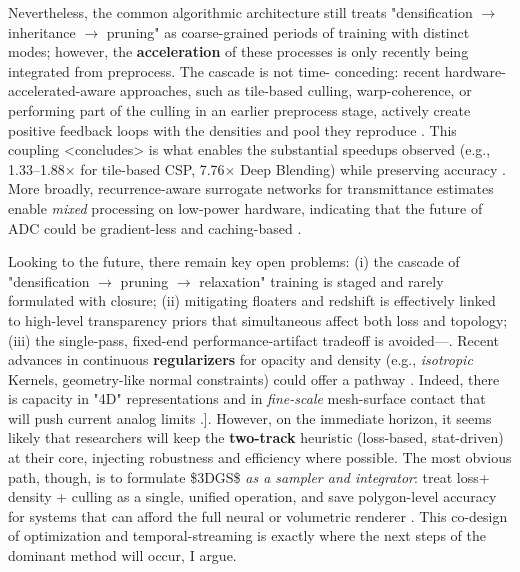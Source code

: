 \documentclass[11pt,a4paper]{article}
\begin{document}
Nevertheless, the common algorithmic architecture still treats "densification $\rightarrow$ inheritance $\rightarrow$ pruning" as coarse-grained periods of training with distinct modes; however, the \textbf{acceleration} of these processes is only recently being integrated from preprocess. The cascade is not time- conceding: recent hardware-accelerated-aware approaches, such as tile-based culling, warp-coherence, or performing part of the culling in an earlier preprocess stage, actively create positive feedback loops with the densities and pool they reproduce \cite{arxiv:2607.28049v1,arxiv:1702.03253v1,arxiv:2602.04251v1}. This coupling <concludes> is what enables the substantial speedups observed (e.g., 1.33--1.88$\times$ for tile-based CSP, 7.76$\times$ Deep Blending) while preserving accuracy \cite{arxiv:2312.10933v1,arxiv:2412.03378v3,arxiv:2602.04251v1}. More broadly, recurrence-aware surrogate networks for transmittance estimates enable \emph{mixed} processing on low-power hardware, indicating that the future of ADC could be gradient-less and caching-based \cite{arxiv:2506.02751v3,arxiv:2506.07069v2}.

Looking to the future, there remain key open problems: (i) the cascade of "densification $\rightarrow$ pruning $\rightarrow$ relaxation" training is staged and rarely formulated with closure; (ii) mitigating floaters and redshift is effectively linked to high-level transparency priors that simultaneous affect both loss and topology; (iii) the single-pass, fixed-end performance-artifact tradeoff is avoided---\cite{arxiv:2605.08565v2}. Recent advances in continuous \textbf{regularizers} for opacity and density (e.g., \emph{isotropic} Kernels, geometry-like normal constraints) could offer a pathway \cite{arxiv:2412.01931v1,arxiv:2605.15010v2}. Indeed, there is capacity in "4D" representations and in \emph{fine-scale} mesh-surface contact that will push current analog limits \cite{arxiv:2605.15010v2,arxiv:2307.02330v2}.]. However, on the immediate horizon, it seems likely that researchers will keep the \textbf{two-track} heuristic (loss-based, stat-driven) at their core, injecting robustness and efficiency where possible. The most obvious path, though, is to formulate \$3DGS\$ \emph{as a sampler and integrator}: treat loss+ density + culling as a single, unified operation, and save polygon-level accuracy for systems that can afford the full neural or volumetric renderer \cite{arxiv:2502.01157v1}. This co-design of optimization and temporal-streaming is exactly where the next steps of the dominant method will occur, I argue.
\end{document}
